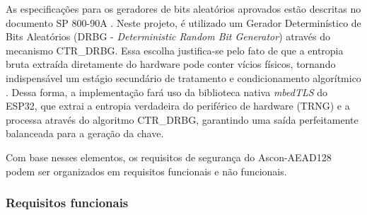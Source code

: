 As especificações para os geradores de bits aleatórios aprovados estão descritas no documento SP 800-90A \cite{barker2015nist90a}. Neste projeto, é utilizado um Gerador Determinístico de Bits Aleatórios (DRBG - \textit{Deterministic Random Bit Generator}) através do mecanismo CTR\_DRBG. Essa escolha justifica-se pelo fato de que a entropia bruta extraída diretamente do hardware pode conter vícios físicos, tornando indispensável um estágio secundário de tratamento e condicionamento algorítmico \cite{turan2018nist90b}. Dessa forma, a implementação fará uso da biblioteca nativa \textit{mbedTLS} do ESP32, que extrai a entropia verdadeira do periférico de hardware (TRNG) e a processa através do algoritmo CTR\_DRBG, garantindo uma saída perfeitamente balanceada para a geração da chave.

Com base nesses elementos, os requisitos de segurança do Ascon-AEAD128 podem ser organizados em requisitos funcionais e não funcionais.

\subsubsection{Requisitos funcionais}

